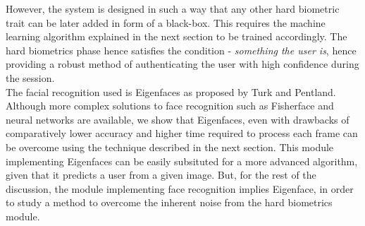 \documentclass[%
        final,
        internal,
        notitlepage,
        narroweqnarray,
        inline,
        ]{ieee}
\begin{document}
However, the system is designed in such a way that any other hard biometric trait can be later added in form of a black-box. This requires the machine learning algorithm explained in the next section to be trained accordingly.
The hard biometrics phase hence satisfies the condition - \emph{something the user is}, hence providing a robust method of authenticating the user with high confidence during the session.\\
The facial recognition used is Eigenfaces\cite{Turk91} as proposed by Turk and Pentland.
Although more complex solutions to face recognition such as Fisherface and neural networks are available, we show that Eigenfaces, even with drawbacks of comparatively lower accuracy and higher time required to process each frame can be overcome using the technique described in the next section.
This module implementing Eigenfaces can be easily subsituted for a more advanced algorithm, given that it predicts a user from a given image.
But, for the rest of the discussion, the module implementing face recognition implies Eigenface, in order to study a method to overcome the inherent noise from the hard biometrics module.
\end{document}
